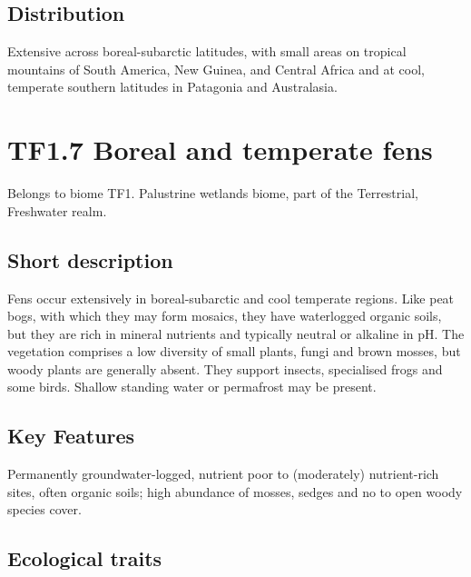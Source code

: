 \documentclass[
  letterpaper,
  DIV=11,
  numbers=noendperiod]{scrartcl}
\begin{document}
\subsection{Distribution}\label{distribution-108}

Extensive across boreal-subarctic latitudes, with small areas on
tropical mountains of South America, New Guinea, and Central Africa and
at cool, temperate southern latitudes in Patagonia and Australasia.

\section{TF1.7 Boreal and temperate
fens}\label{tf1.7-boreal-and-temperate-fens}

Belongs to biome TF1. Palustrine wetlands biome, part of the
Terrestrial, Freshwater realm.

\subsection{Short description}\label{short-description-109}

Fens occur extensively in boreal-subarctic and cool temperate regions.
Like peat bogs, with which they may form mosaics, they have waterlogged
organic soils, but they are rich in mineral nutrients and typically
neutral or alkaline in pH. The vegetation comprises a low diversity of
small plants, fungi and brown mosses, but woody plants are generally
absent. They support insects, specialised frogs and some birds. Shallow
standing water or permafrost may be present.

\subsection{Key Features}\label{key-features-109}

Permanently groundwater-logged, nutrient poor to (moderately)
nutrient-rich sites, often organic soils; high abundance of mosses,
sedges and no to open woody species cover.

\subsection{Ecological traits}\label{ecological-traits-109}
\end{document}
